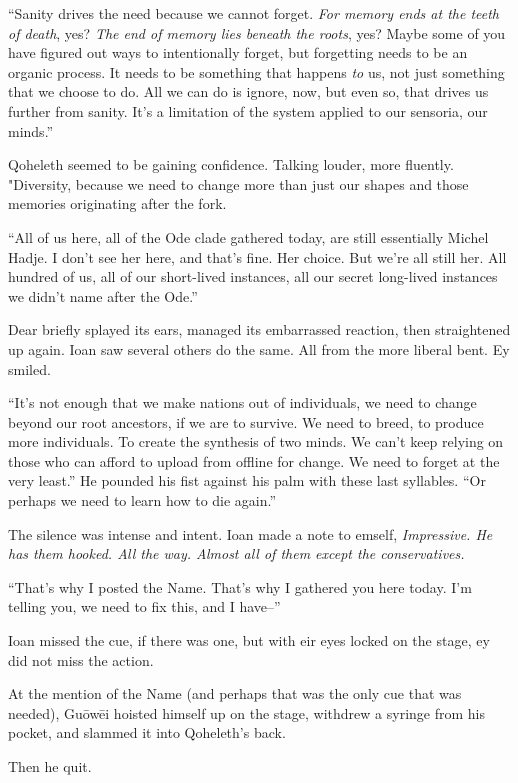 ``Sanity drives the need because we cannot forget. \emph{For memory ends at the teeth of death}, yes? \emph{The end of memory lies beneath the roots}, yes? Maybe some of you have figured out ways to intentionally forget, but forgetting needs to be an organic process. It needs to be something that happens \emph{to} us, not just something that we choose to do. All we can do is ignore, now, but even so, that drives us further from sanity. It's a limitation of the system applied to our sensoria, our minds.''

Qoheleth seemed to be gaining confidence. Talking louder, more fluently. "Diversity, because we need to change more than just our shapes and those memories originating after the fork.

``All of us here, all of the Ode clade gathered today, are still essentially Michel Hadje. I don't see her here, and that's fine. Her choice. But we're all still her. All hundred of us, all of our short-lived instances, all our secret long-lived instances we didn't name after the Ode.''

Dear briefly splayed its ears, managed its embarrassed reaction, then straightened up again. Ioan saw several others do the same. All from the more liberal bent. Ey smiled.

``It's not enough that we make nations out of individuals, we need to change beyond our root ancestors, if we are to survive. We need to breed, to produce more individuals. To create the synthesis of two minds. We can't keep relying on those who can afford to upload from offline for change. We need to forget at the very least.'' He pounded his fist against his palm with these last syllables. ``Or perhaps we need to learn how to die again.''

The silence was intense and intent. Ioan made a note to emself, \emph{Impressive. He has them hooked. All the way. Almost all of them except the conservatives.}

``That's why I posted the Name. That's why I gathered you here today. I'm telling you, we need to fix this, and I have--''

Ioan missed the cue, if there was one, but with eir eyes locked on the stage, ey did not miss the action.

At the mention of the Name (and perhaps that was the only cue that was needed), Guōwēi hoisted himself up on the stage, withdrew a syringe from his pocket, and slammed it into Qoheleth's back.

Then he quit.

